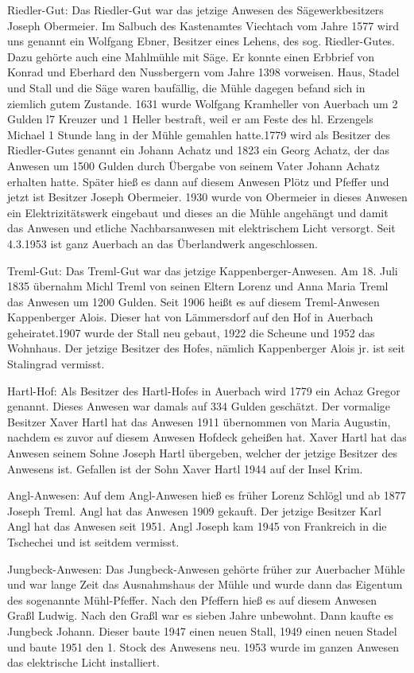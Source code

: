 \documentclass{book}
\begin{document}
Riedler-Gut: Das Riedler-Gut war das jetzige Anwesen des Sägewerkbesitzers
Joseph Obermeier. Im Salbuch des Kastenamtes Viechtach vom Jahre 1577 wird uns
genannt ein Wolfgang Ebner, Besitzer eines Lehens, des sog. Riedler-Gutes. Dazu
gehörte auch eine Mahlmühle mit Säge. Er konnte einen Erbbrief von Konrad und
Eberhard den Nussbergern vom Jahre 1398 vorweisen. Haus, Stadel und Stall und
die Säge waren baufällig, die Mühle dagegen befand sich in ziemlich gutem
Zustande. 1631 wurde Wolfgang Kramheller von Auerbach um 2 Gulden l7 Kreuzer und
1 Heller bestraft, weil er am Feste des hl. Erzengels Michael 1 Stunde lang in
der Mühle gemahlen hatte.1779 wird als Besitzer des Riedler-Gutes genannt ein
Johann Achatz und 1823 ein Georg Achatz, der das Anwesen um 1500 Gulden durch
Übergabe von seinem Vater Johann Achatz erhalten hatte. Später hieß es dann auf
diesem Anwesen Plötz und Pfeffer und jetzt ist Besitzer Joseph Obermeier. 1930
wurde von Obermeier in dieses Anwesen ein Elektrizitätswerk eingebaut und dieses
an die Mühle angehängt und damit das Anwesen und etliche Nachbarsanwesen mit
elektrischem Licht versorgt. Seit 4.3.1953 ist ganz Auerbach an das Überlandwerk
angeschlossen.

Treml-Gut: Das Treml-Gut war das jetzige Kappenberger-Anwesen. Am 18. Juli 1835
übernahm Michl Treml von seinen Eltern Lorenz und Anna Maria Treml das Anwesen
um 1200 Gulden. Seit 1906 heißt es auf diesem Treml-Anwesen Kappenberger Alois.
Dieser hat von Lämmersdorf auf den Hof in Auerbach geheiratet.1907 wurde der
Stall neu gebaut, 1922 die Scheune und 1952 das Wohnhaus. Der jetzige Besitzer
des Hofes, nämlich Kappenberger Alois jr. ist seit Stalingrad vermisst.

Hartl-Hof: Als Besitzer des Hartl-Hofes in Auerbach wird 1779 ein Achaz Gregor
genannt. Dieses Anwesen war damals auf 334 Gulden geschätzt. Der vormalige
Besitzer Xaver Hartl hat das Anwesen 1911 übernommen von Maria Augustin, nachdem
es zuvor auf diesem Anwesen Hofdeck geheißen hat. Xaver Hartl hat das Anwesen
seinem Sohne Joseph Hartl übergeben, welcher der jetzige Besitzer des Anwesens
ist. Gefallen ist der Sohn Xaver Hartl 1944 auf der Insel Krim.

Angl-Anwesen: Auf dem Angl-Anwesen hieß es früher Lorenz Schlögl und ab 1877
Joseph Treml. Angl hat das Anwesen 1909 gekauft. Der jetzige Besitzer Karl Angl
hat das Anwesen seit 1951. Angl Joseph kam 1945 von Frankreich in die Tschechei
und ist seitdem vermisst.

Jungbeck-Anwesen: Das Jungbeck-Anwesen gehörte früher zur Auerbacher Mühle und
war lange Zeit das Ausnahmshaus der Mühle und wurde dann das Eigentum des
sogenannte Mühl-Pfeffer. Nach den Pfeffern hieß es auf diesem Anwesen Graßl
Ludwig. Nach den Graßl war es sieben Jahre unbewohnt. Dann kaufte es Jungbeck
Johann. Dieser baute 1947 einen neuen Stall, 1949 einen neuen Stadel und baute
1951 den 1. Stock des Anwesens neu. 1953 wurde im ganzen Anwesen das elektrische
Licht installiert.
\end{document}
